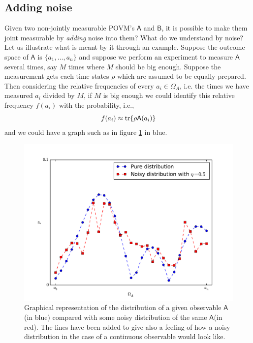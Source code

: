 \documentclass[10pt, a4paper]{amsart}
\begin{document}
\subsection{Adding noise}
\label{subsec:Adding_noise}
Given two non-jointly measurable  POVM's $\mathsf{A}$ and $\mathsf{B}$, it is possible to make them joint measurable by \textit{adding} noise into them? What do we understand by noise?  Let us illustrate what is meant by it through an example. Suppose the outcome space of $\mathsf{A}$ is $\{a_{1}, \ldots , a_{n}\}$ and suppose we perform an experiment to measure $\mathsf{A}$ several times, say $M$ times where $M$ should be big enough. Suppose the measurement gets each time states $\rho$ which are assumed to be equally prepared. Then considering the relative frequencies of every $a_{i}\in \Omega_{A}$, i.e. the times we have measured $a_{i}$ divided by $M$, if $M$ is big enough we could identify this relative frequency $f(a_{i})$ with the probability, i.e., 
$$
f(a_{i}) \approx \mathrm{tr} \{\rho \mathsf{A}(a_{i})\}
$$
and we could have a graph such as in figure \ref{fig:pure_vs_noise} in blue.

\begin{figure}[h]
\centering
\includegraphics[scale=.6]{images/pure_vs_noise.pdf}
\caption{Graphical representation of the distribution of a given observable $\mathsf{A}$ (in blue) compared with some noisy distribution of the same $\mathsf{A}$(in red). The lines have been added to give also a feeling of how a noisy distribution in the case of a continuous observable would look like. }
\label{fig:pure_vs_noise}
\end{figure}
\end{document}
